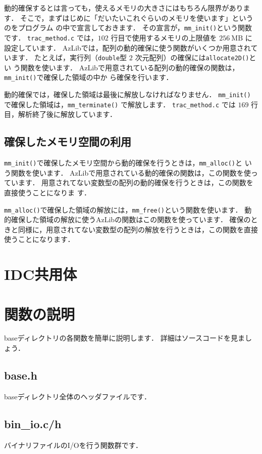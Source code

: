 動的確保するとは言っても，使えるメモリの大きさにはもちろん限界があります．
そこで，まずはじめに「だいたいこれぐらいのメモリを使います」というのをプログラム
の中で宣言しておきます．
その宣言が，\verb|mm_init()|という関数です．
\verb|trac_method.c| では，$102$ 行目で使用するメモリの上限値を 
$256 \ \mathrm{MB}$ に設定しています．
AzLibでは，配列の動的確保に使う関数がいくつか用意されています．
たとえば，実行列（\verb|double|型 $2$ 次元配列）の確保には\verb|allocate2D()|とい
う関数を使います．
AzLibで用意されている配列の動的確保の関数は，\verb|mm_init()|で確保した領域の中か
ら確保を行います．

動的確保では，確保した領域は最後に解放しなければなりません．
\verb|mm_init()| で確保した領域は，\verb|mm_terminate()| で解放します．
\verb|trac_method.c| では $169$ 行目，解析終了後に解放しています．

\subsection{確保したメモリ空間の利用}
\verb|mm_init()|で確保したメモリ空間から動的確保を行うときは，\verb|mm_alloc()|と
いう関数を使います．
AzLibで用意されている動的確保の関数は，この関数を使っています．
用意されてない変数型の配列の動的確保を行うときは，この関数を直接使うことになりま
す．

\verb|mm_alloc()|で確保した領域の解放には，\verb|mm_free()|という関数を使います．
動的確保した領域の解放に使うAzLibの関数はこの関数を使っています．
確保のときと同様に，用意されてない変数型の配列の解放を行うときは，この関数を直接
使うことになります．


\section{IDC共用体}


\section{関数の説明}
baseディレクトリの各関数を簡単に説明します．
詳細はソースコードを見ましょう．

\subsection{base.h}
baseディレクトリ全体のヘッダファイルです．

\subsection{bin\_io.c/h}
バイナリファイルのI/Oを行う関数群です．

